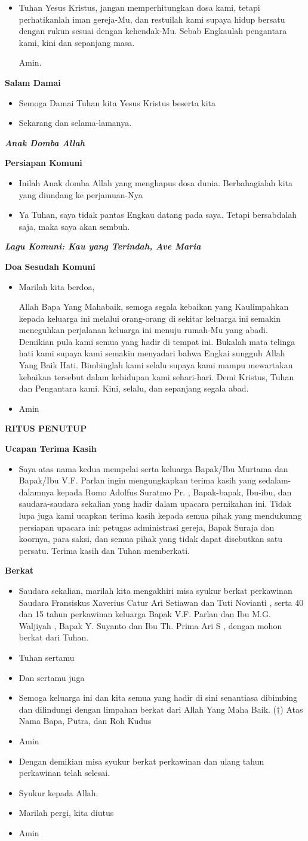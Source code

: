 \documentclass[10pt]{book}
\makeatletter
\newcommand{\judul}[1]{%
  {\parindent \z@ \centering \normalfont
    \interlinepenalty\@M \Large \bfseries #1\par\nobreak \vskip 20\p@ }}
\newcommand{\subjudul}[1]{%
  {\parindent \z@ \normalfont
    \interlinepenalty\@M \bfseries #1\par\nobreak \vskip 20\p@ }}
\newcommand{\lagu}[1]{%
  {\parindent \z@ \normalfont
    \interlinepenalty\@M \bfseries \emph{#1}\par\nobreak \vskip 20\p@ }}
\newcommand{\BU}[1]{\begin{itemize} \item[U:] #1 \end{itemize}}
\newcommand{\BI}[1]{\begin{itemize} \item[I:] #1 \end{itemize}}
\newcommand{\BP}[1]{\begin{itemize} \item[P:] #1 \end{itemize}}
\newcommand{\ultah}{40 }
\newcommand{\suami}{V.F. Parlan }
\newcommand{\istri}{M.G. Waljiyah }
\newcommand{\ultahdua}{15 }
\newcommand{\suamidua}{Y. Suyanto }
\newcommand{\istridua}{Th. Prima Ari S }
\newcommand{\mempelaip}{Fransiskus Xaverius Catur Ari Setiawan }
\newcommand{\mempelaiw}{Tuti Novianti }
\newcommand{\romo}{Adolfus Suratmo Pr. }
\makeatother
\begin{document}
\BU{Tuhan Yesus Kristus, jangan memperhitungkan dosa kami, tetapi perhatikanlah iman gereja-Mu, dan restuilah kami supaya hidup bersatu dengan rukun sesuai dengan kehendak-Mu. Sebab Engkaulah pengantara kami, kini dan sepanjang masa.

Amin.}

\subjudul{Salam Damai}

\BI{Semoga Damai Tuhan kita Yesus Kristus beserta kita}

\BU{Sekarang dan selama-lamanya.}

\lagu{Anak Domba Allah}

\subjudul{Persiapan Komuni}

\BI{Inilah Anak domba Allah yang menghapus dosa dunia. Berbahagialah kita yang diundang ke perjamuan-Nya}
\BU{Ya Tuhan, saya tidak pantas Engkau datang pada saya. Tetapi bersabdalah saja, maka saya akan sembuh.}

\lagu{Lagu Komuni: Kau yang Terindah, Ave Maria}

\subjudul{Doa Sesudah Komuni}

\BI{Marilah kita berdoa,

Allah Bapa Yang Mahabaik, semoga segala kebaikan yang Kaulimpahkan kepada keluarga ini melalui orang-orang di sekitar keluarga ini semakin meneguhkan perjalanan keluarga ini menuju rumah-Mu yang abadi. Demikian pula kami semua yang hadir di tempat ini. Bukalah mata telinga hati kami supaya kami semakin menyadari bahwa Engkai sungguh Allah Yang Baik Hati. Bimbinglah kami selalu supaya kami mampu mewartakan kebaikan tersebut dalam kehidupan kami sehari-hari. Demi Kristus, Tuhan dan Pengantara kami. Kini, selalu, dan sepanjang segala abad.}

\BU{Amin}

\judul{RITUS PENUTUP}

\subjudul{Ucapan Terima Kasih}

\BP{Saya atas nama kedua mempelai serta keluarga Bapak/Ibu Murtama dan Bapak/Ibu \suami ingin mengungkapkan terima kasih yang sedalam-dalamnya kepada Romo \romo, Bapak-bapak, Ibu-ibu, dan saudara-saudara sekalian yang hadir dalam upacara pernikahan ini. Tidak lupa juga kami ucapkan terima kasih kepada semua pihak yang mendukunng persiapan upacara ini: petugas administrasi gereja, Bapak Suraja dan koornya, para saksi, dan semua pihak yang tidak dapat disebutkan satu persatu. Terima kasih dan Tuhan memberkati.}

\subjudul{Berkat}

\BI{Saudara sekalian, marilah kita mengakhiri misa syukur berkat perkawinan Saudara \mempelaip dan \mempelaiw, serta \ultah dan \ultahdua tahun perkawinan keluarga Bapak \suami dan Ibu \istri, Bapak \suamidua dan Ibu \istridua, dengan mohon berkat dari Tuhan.}
\BI{Tuhan sertamu}
\BU{Dan sertamu juga}
\BI{Semoga keluarga ini dan kita semua yang hadir di sini senantiasa dibimbing dan dilindungi dengan limpahan berkat dari Allah Yang Maha Baik. ($\dagger$) Atas Nama Bapa, Putra, dan Roh Kudus}
\BU{Amin}
\BI{Dengan demikian misa syukur berkat perkawinan dan ulang tahun perkawinan telah selesai.}
\BU{Syukur kepada Allah.}
\BI{Marilah pergi, kita diutus}
\BU{Amin}
\end{document}
